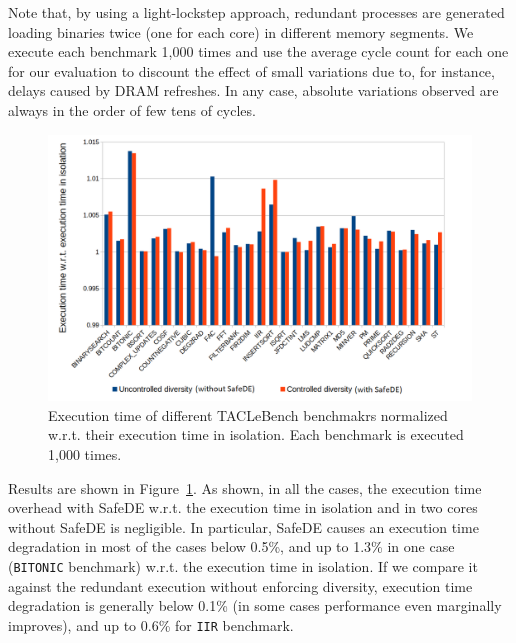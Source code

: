 
Note that, by using a light-lockstep approach, redundant processes are generated loading binaries twice (one for each core) in different memory segments.
We execute each benchmark 1,000 times and use the average cycle count for each one for our evaluation to discount the effect of small variations due to, for instance, delays caused by DRAM refreshes. In any case, absolute variations observed are always in the order of few tens of cycles.

\begin{figure}[t!]
\centering
  \includegraphics[width=1\columnwidth]{imgs/tacle_results.png} 
  \caption{Execution time of different TACLeBench benchmakrs normalized w.r.t. their execution time in isolation. Each benchmark is executed 1,000 times.}
  \label{fig:tacle_results}
\end{figure}

Results are shown in Figure~\ref{fig:tacle_results}. As shown, in all the cases, the execution time overhead with SafeDE w.r.t. the execution time in isolation and in two cores without SafeDE is negligible. In particular, SafeDE causes an execution time degradation in most of the cases below 0.5\%, and up to 1.3\% in one case (\texttt{BITONIC} benchmark) w.r.t. the execution time in isolation. If we compare it against the redundant execution without enforcing diversity, execution time degradation is generally below 0.1\% (in some cases performance even marginally improves), and up to 0.6\% for \texttt{IIR} benchmark.

